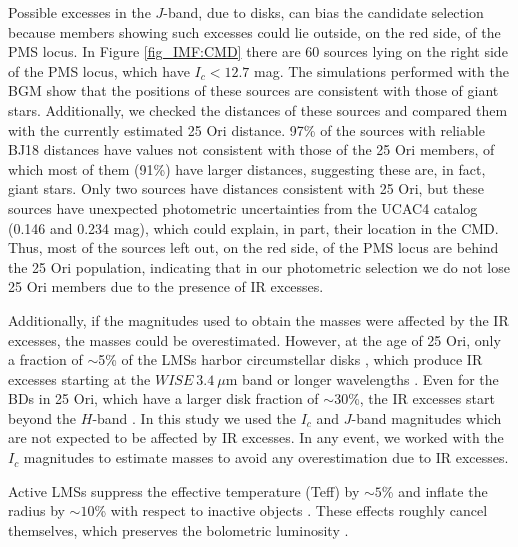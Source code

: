 \documentclass[12pt]{article}
\newcounter{subsubsubsection}[subsubsection]
\begin{document}
\label{sec_IMF:excesses}
Possible excesses in the $J$-band, due to disks, can bias the candidate selection because members showing such excesses could lie outside, on the red side, of the PMS locus. In Figure \ref{fig_IMF:CMD} there are 60 sources lying on the right side of the PMS locus, which have $I_c<12.7$ mag. The simulations performed with the BGM show that the positions of these sources are consistent with those of giant stars. Additionally, we checked the distances of these sources and compared them with the currently estimated 25 Ori distance. 97\% of the sources with reliable BJ18 distances have values not consistent with those of the 25 Ori members, of which most of them (91\%) have larger distances, suggesting these are, in fact, giant stars. Only two sources have distances consistent with 25 Ori, but these sources have unexpected photometric uncertainties from the UCAC4 catalog (0.146 and 0.234 mag), which could explain, in part, their location in the CMD. Thus, most of the sources left out, on the red side, of the PMS locus are behind the 25 Ori population, indicating that in our photometric selection we do not lose 25 Ori members due to the presence of IR excesses.

Additionally, if the magnitudes used to obtain the masses were affected by the IR excesses, the masses could be overestimated. However, at the age of 25 Ori, only a fraction of $\sim$5\% of the LMSs harbor circumstellar disks \citep{Briceno2005,Briceno2007,Hernandez2007a,Downes2014,Briceno2018}, which produce IR excesses starting at the $WISE\ 3.4\ \mu$m band or longer wavelengths \citep{Suarez2017}. Even for the BDs in 25 Ori, which have a larger disk fraction of $\sim 30$\%, the IR excesses start beyond the $H$-band \citep{Downes2015}. In this study we used the $I_c$ and $J$-band magnitudes which are not expected to be affected by IR excesses. In any event, we worked with the $I_c$ magnitudes to estimate masses to avoid any overestimation due to IR excesses.

\label{sec_IMF:activity}

Active LMSs suppress the effective temperature (\ac{Teff}) by $\sim5$\% and inflate the radius by $\sim10$\% with respect to inactive objects \citep[e.g. ][]{Lopez-Morales2007}. These effects roughly cancel themselves, which preserves the bolometric luminosity \citep{Stassun2012}. 
\end{document}
